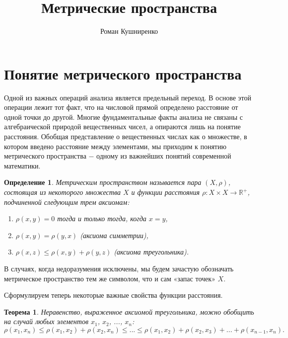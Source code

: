 \documentclass{article}
\title{Метрические пространства}
\author{Роман Кушниренко}
\newtheorem{theorem}{Теорема}[section]
\newtheorem{definition}{Определение}[section]
\begin{document}

	\maketitle

	\section{Понятие метрического пространства}

Одной из важных операций анализа является предельный переход. В основе этой операции лежит тот факт, что на числовой прямой определено расстояние от одной точки до другой. Многие фундаментальные факты анализа не связаны с алгебраической природой вещественных чисел, а опираются лишь на понятие расстояния. Обобщая представление о вещественных числах как о множестве, в котором введено расстояние между элементами, мы приходим к понятию метрического пространства \(-\) одному из важнейших понятий современной математики.

\begin{definition}
Метрическим пространством называется пара \((X, \rho)\), состоящая из некоторого множества \(X\) и функции расстояния \(\rho : X \times X \to \mathbb{R^{+}}\), подчиненной следующим трем аксиомам:
\begin{enumerate}
    \item \(\rho(x, y) = 0\) тогда и только тогда, когда \(x = y\),
    \item \(\rho(x, y) = \rho(y, x)\) (аксиома симметрии),
    \item \(\rho(x, z) \leq \rho(x, y) + \rho(y, z)\) (аксиома треугольника).
\end{enumerate}
\end{definition}

В случаях, когда недоразумения исключены, мы будем зачастую обозначать метрическое пространство тем же символом, что и сам «запас точек» \(X\). \newline

Сформулируем теперь некоторые важные свойства функции расстояния.

\begin{theorem}
Неравенство, выраженное аксиомой треугольника, можно обобщить на случай любых элементов \(x_1\), \(x_2\), ..., \(x_n\):
\[
\rho(x_1, x_n) \leq \rho(x_1, x_2) + \rho(x_2, x_n) \leq ... \leq \rho(x_1, x_2) + \rho(x_2, x_3) + ... + \rho(x_{n-1}, x_n).
\]
\end{theorem}
\end{document}
